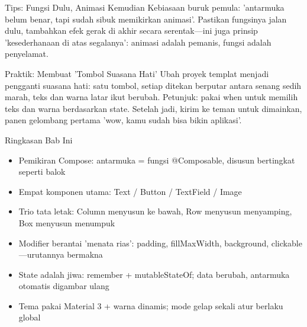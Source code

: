 \begin{tcbinfo}{Tips: Fungsi Dulu, Animasi Kemudian}
Kebiasaan buruk pemula: 'antarmuka belum benar, tapi sudah sibuk memikirkan animasi'. Pastikan fungsinya jalan dulu, tambahkan efek gerak di akhir secara serentak—ini juga prinsip 'kesederhanaan di atas segalanya': animasi adalah pemanis, fungsi adalah penyelamat.

\end{tcbinfo}

\begin{tcbpractice}{Praktik: Membuat 'Tombol Suasana Hati'}
Ubah proyek templat menjadi pengganti suasana hati: satu tombol, setiap ditekan berputar antara senang sedih marah, teks dan warna latar ikut berubah. Petunjuk: pakai when untuk memilih teks dan warna berdasarkan state. Setelah jadi, kirim ke teman untuk dimainkan, panen gelombang pertama 'wow, kamu sudah bisa bikin aplikasi'.

\end{tcbpractice}

\begin{tcbsummary}{Ringkasan Bab Ini}
\begin{itemize}
  \item Pemikiran Compose: antarmuka = fungsi @Composable, disusun bertingkat seperti balok
  \item Empat komponen utama: Text / Button / TextField / Image
  \item Trio tata letak: Column menyusun ke bawah, Row menyusun menyamping, Box menyusun menumpuk
  \item Modifier berantai 'menata rias': padding, fillMaxWidth, background, clickable—urutannya bermakna
  \item State adalah jiwa: remember + mutableStateOf; data berubah, antarmuka otomatis digambar ulang
  \item Tema pakai Material 3 + warna dinamis; mode gelap sekali atur berlaku global
\end{itemize}

\end{tcbsummary}
